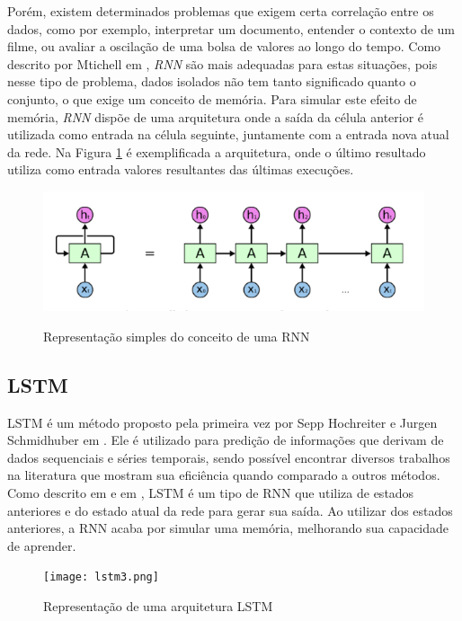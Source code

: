 Porém, existem determinados problemas que exigem certa correlação entre os dados, como por exemplo, interpretar um documento, entender o contexto de um filme, ou avaliar a oscilação de uma bolsa de valores ao longo do tempo. Como descrito por Mtichell em \cite{mitchell1997}, \textit{\acrshort{RNN}} são mais adequadas para estas situações, pois nesse tipo de problema, dados isolados não tem tanto significado quanto o conjunto, o que exige um conceito de memória. Para simular este efeito de memória, \textit{\acrshort{RNN}} dispõe de uma arquitetura onde a saída da célula anterior é utilizada como entrada na célula seguinte, juntamente com a entrada nova atual da rede. Na Figura \ref{figure:rnn} é exemplificada a arquitetura, onde o último resultado utiliza como entrada valores resultantes das últimas execuções.

\begin{figure}[htbp]
    \centering
    \includegraphics[scale=0.4]{rnnExample.png}
    \label{figure:rnn}
    \caption[Representação simples do conceito de um RNN]{Representação simples do conceito de uma RNN \footnotemark}
\end{figure}

\subsection{\acrfull{LSTM}}

\acrshort{LSTM} é um método proposto pela primeira vez por Sepp Hochreiter e Jurgen Schmidhuber em \cite{Sepp_1997}. Ele é utilizado para predição de informações que derivam de dados sequenciais e séries temporais, sendo possível encontrar diversos trabalhos na literatura que mostram sua eficiência quando comparado a outros métodos. Como descrito em \cite{Zainab_2018} e em \cite{Xiaolei_2015}, \acrshort{LSTM} é um tipo de \acrshort{RNN} que utiliza de estados anteriores e do estado atual da rede para gerar sua saída. Ao utilizar dos estados anteriores, a \acrshort{RNN} acaba por simular uma memória, melhorando sua capacidade de aprender. 

\begin{figure}[htbp]
    \centering
    \texttt{[image: lstm3.png]}
    \label{figure:eixo}
    \caption[Representação de uma arquitetura LSTM]{Representação de uma arquitetura LSTM\footnotemark}
\end{figure}

